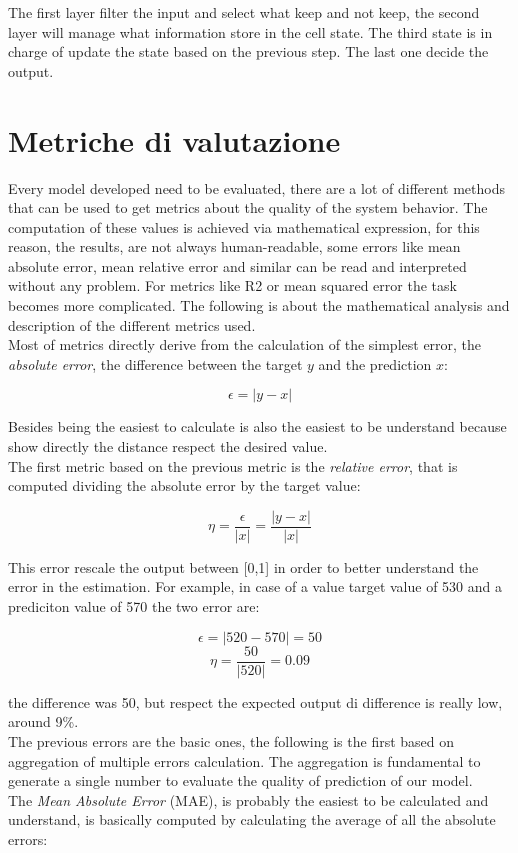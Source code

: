 \documentclass[%
    corpo=12pt,
    twoside,
    oldstyle,
    autoretitolo,
    greek,
    evenboxes,
]{toptesi}
\begin{document}
The first layer filter the input and select what keep and not keep, the second layer will manage what information store in the cell state. The third state is in charge of update the state based on the previous step. The last one decide the output.


\section{Metriche di valutazione}
Every model developed need to be evaluated, there are a lot of different methods that can be used to get metrics about the quality of the system behavior. The computation of these values is achieved via mathematical expression, for this reason, the results, are not always human-readable, some errors like mean absolute error, mean relative error and similar can be read and interpreted without any problem. For metrics like R2 or mean squared error the task becomes more complicated. The following is about the mathematical analysis and description of the different metrics used.\\
Most of metrics directly derive from the calculation of the simplest error, the \textit{absolute error}, the difference between the target $y$ and the prediction $x$:
\begin{center}
  \begin{equation}
    \epsilon = |y - x|
  \end{equation}
\end{center}
Besides being the easiest to calculate is also the easiest to be understand because show directly the distance respect the desired value.\\
The first metric based on the previous metric is the \textit{relative error}, that is computed dividing the absolute error by the target value:
\begin{center}
  \begin{equation}
    \eta = \frac{\epsilon}{|x|} = \frac{|y - x|}{|x|}
  \end{equation}
\end{center}
This error rescale the output between [0,1] in order to better understand the error in the estimation.
For example, in case of a value target value of 530 and a prediciton value of 570 the two error are:
\begin{center}
  \begin{equation}
      \epsilon = |520-570| = 50
  \end{equation}
  \begin{equation}
      \eta = \frac{50}{|520|} = 0.09
  \end{equation}
\end{center}
the difference was 50, but respect the expected output di difference is really low, around 9\%.\\
The previous errors are the basic ones, the following is the first based on aggregation of multiple errors calculation. The aggregation is fundamental to generate a single number to evaluate the quality of prediction of our model.\\
The \textit{Mean Absolute Error} (MAE), is probably the easiest to be calculated and understand, is basically computed by calculating the average of all the absolute errors:
\end{document}
